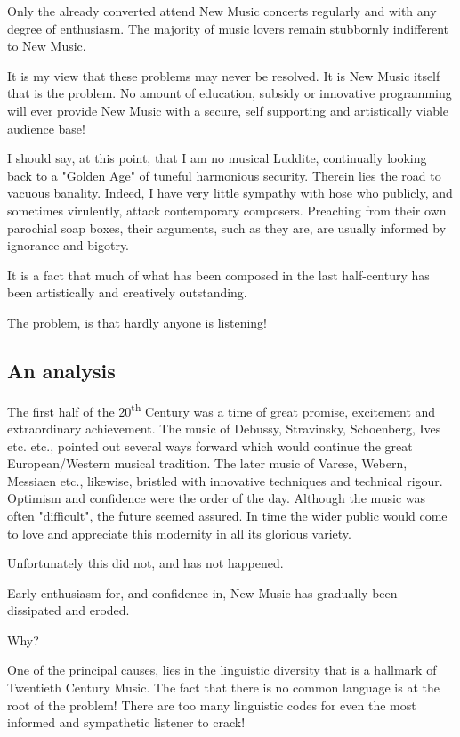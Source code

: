 \documentclass{article}
\begin{document}
Only the already converted attend New Music concerts regularly and with any degree of enthusiasm.
The majority of music lovers remain stubbornly indifferent to New Music.

It is my view that these problems may never be resolved.
It is New Music itself that is the problem.
No amount of education, subsidy or innovative programming will ever provide New Music with a secure, self supporting and artistically viable audience base!

I should say, at this point, that I am no musical Luddite, continually looking back to a "Golden Age" of tuneful harmonious security.
Therein lies the road to vacuous banality.
Indeed, I have very little sympathy with hose who publicly, and sometimes virulently, attack contemporary composers.
Preaching from their own parochial soap boxes, their arguments, such as they are, are usually informed by ignorance and bigotry.

It is a fact that much of what has been composed in the last half-century has been artistically and creatively outstanding.

The problem, is that hardly anyone is listening!

\subsection{An analysis}

The first half of the 20\textsuperscript{th} Century was a time of great promise, excitement and extraordinary achievement.
The music of Debussy, Stravinsky, Schoenberg, Ives etc. etc., pointed out several ways forward which would continue the great European/Western musical tradition.
The later music of Varese, Webern, Messiaen etc., likewise, bristled with innovative techniques and technical rigour.
Optimism and confidence were the order of the day.
Although the music was often "difficult", the future seemed assured.
In time the wider public would come to love and appreciate this modernity in all its glorious variety.

Unfortunately this did not, and has not happened.

Early enthusiasm for, and confidence in, New Music has gradually been dissipated and eroded.

Why?

One of the principal causes, lies in the linguistic diversity that is a hallmark of Twentieth Century Music.
The fact that there is no common language is at the root of the problem!
There are too many linguistic codes for even the most informed and sympathetic listener to crack!
\end{document}
